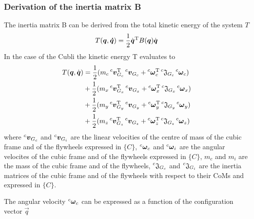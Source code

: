 \subsubsection{Derivation of the inertia matrix B}
The inertia matrix B can be derived from the total kinetic energy of the system $T$
\begin{equation}\label{eq:T_general}
  T(\vec{q}, \vec{\dot{q}}) = \frac{1}{2} \dot{\vec{q}}\transpose B(\vec{q}) \dot{\vec{q}}
\end{equation}
In the case of the Cubli the kinetic energy T evaluates to
\begin{equation}\label{eq:T_cubli}
  \begin{split}
    T(\vec{q}, \dot{\vec{q}}) &= \frac{1}{2}(m_c \prescript{c}{}{\vec{v}}_{G_{c}}\transpose \prescript{c}{}{\vec{v}}_{G_{c}} + \prescript{c}{}{\vec{\omega}}_{c}\transpose \prescript{c}{}{\mathfrak{J}}_{G_{c}} \prescript{c}{}{\vec{\omega}}_{c}) \\
    &+ \frac{1}{2}(m_x \prescript{c}{}{\vec{v}}_{G_{x}}\transpose \prescript{c}{}{\vec{v}}_{G_{x}} + \prescript{c}{}{\vec{\omega}}_{x}\transpose \prescript{c}{}{\mathfrak{J}}_{G_{x}} \prescript{c}{}{\vec{\omega}}_{x}) \\
    &+ \frac{1}{2}(m_y \prescript{c}{}{\vec{v}}_{G_{y}}\transpose \prescript{c}{}{\vec{v}}_{G_{y}} + \prescript{c}{}{\vec{\omega}}_{y}\transpose \prescript{c}{}{\mathfrak{J}}_{G_{y}} \prescript{c}{}{\vec{\omega}}_{y}) \\
    &+ \frac{1}{2}(m_z \prescript{c}{}{\vec{v}}_{G_{z}}\transpose \prescript{c}{}{\vec{v}}_{G_{z}} + \prescript{c}{}{\vec{\omega}}_{z}\transpose \prescript{c}{}{\mathfrak{J}}_{G_{z}} \prescript{c}{}{\vec{\omega}}_{z})
  \end{split}
\end{equation}
where $\prescript{c}{}{\vec{v}}_{G_{c}}$ and $\prescript{c}{}{\vec{v}}_{G_{i}}$
are the linear velocities of the centre of mass of the cubic frame and
of the flywheels expressed in $\{C\}$, $\prescript{c}{}{\vec{\omega}}_{c}$
and $\prescript{c}{}{\vec{\omega}}_{i}$ are the angular velocites of the cubic frame
and of the flywheels expressed in $\{C\}$,
$m_c$ and $m_i$ are the mass of the cubic frame and of the flywheels,
$\prescript{c}{}{\mathfrak{J}}_{G_{c}}$ and $\prescript{c}{}{\mathfrak{J}}_{G_{i}}$
are the inertia matrices of the cubic frame and of the flywheels with respect to their
CoMs and expressed in $\{C\}$.
\par
The angular velocity $\prescript{c}{}{\vec{\omega}}_c$ can be expressed as a function of the configuration vector $\vec{q}$
